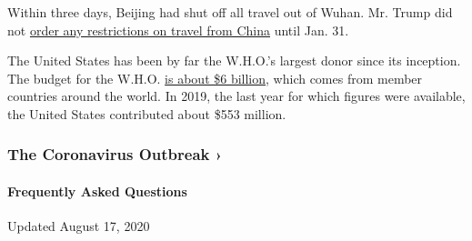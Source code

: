 Within three days, Beijing had shut off all travel out of Wuhan. Mr.
Trump did not
\href{https://www.nytimes3xbfgragh.onion/2020/01/31/business/china-travel-coronavirus.html}{order
any restrictions on travel from China} until Jan. 31.

The United States has been by far the W.H.O.'s largest donor since its
inception. The budget for the W.H.O.
\href{http://open.who.int/2018-19/budget-and-financing/gpw-overview}{is
about \$6 billion}, which comes from member countries around the world.
In 2019, the last year for which figures were available, the United
States contributed about \$553 million.

\href{https://www.nytimes3xbfgragh.onion/news-event/coronavirus?action=click\&pgtype=Article\&state=default\&region=MAIN_CONTENT_3\&context=storylines_faq}{}

\hypertarget{the-coronavirus-outbreak-}{%
\subsubsection{The Coronavirus Outbreak
›}\label{the-coronavirus-outbreak-}}

\hypertarget{frequently-asked-questions}{%
\paragraph{Frequently Asked
Questions}\label{frequently-asked-questions}}

Updated August 17, 2020

